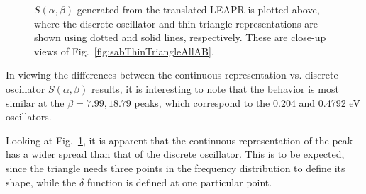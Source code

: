 \documentclass[Master.tex]{subfiles}
\begin{document}
\begin{figure}[h]
\begin{center}
        \caption[Close-up view of $S(\alpha,\beta)$ grid that compares oscillator vs. thin triangle representation (translated LEAPR used)]{$S(\alpha,\beta)$ generated from the translated LEAPR is plotted above, where the discrete oscillator and thin triangle representations are shown using dotted and solid lines, respectively. These are close-up views of Fig.~\ref{fig:sabThinTriangleAllAB}.}
        \label{fig:sabThinTriangleAllABZoomed}
      \end{center}
    \end{figure}

    In viewing the differences between the continuous-representation vs. discrete oscillator $S(\alpha,\beta)$ results, it is interesting to note that the behavior is most similar at the $\beta=7.99,18.79$ peaks, which correspond to the 0.204 and 0.4792 eV oscillators.



    
    Looking at Fig.~\ref{fig:sabThinTriangleAllABZoomed}, it is apparent that the continuous representation of the peak has a wider spread than that of the discrete oscillator. This is to be expected, since the triangle needs three points in the frequency distribution to define its shape, while the $\delta$ function is defined at one particular point. 


\end{document}
